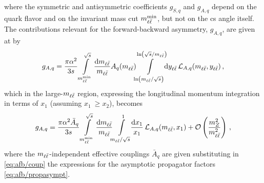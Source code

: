 where the symmetric and antisymmetric coefficients $g_{S,q}$ and $g_{A,q}$ depend on the quark flavor
and on the invariant mass cut $m_{\ell\bar{\ell}}^{\text{min}}$, but not on the
\acrlong{cs} angle itself.
%
The contributions relevant for the forward-backward asymmetry, $g_{A,q}$,
are given at \lo by
\begin{equation}
\label{eq:afb/gAq_integrated_1}
g_{A,q} =\frac{\pi \alpha^2}{3 s} \int\limits_{m_{\ell\bar{\ell}}^{\text{min}}}^{\sqrt s}\frac{\dd m_{\ell\bar{\ell}}}{m_{\ell\bar{\ell}}}A_{q}(m_{\ell\bar{\ell}})\!\!\int\limits_{\ln(m_{\ell\bar{\ell}}/\sqrt s)}^{\ln(\sqrt s/m_{\ell\bar{\ell}})}\!\!\dd y_{\ell\bar{\ell}}\, \mathcal{L}_{A,q}(m_{\ell\bar{\ell}},y_{\ell\bar{\ell}}) \, ,
\end{equation}
which in the large-$m_{\ell\bar{\ell}}$ region,
 expressing the longitudinal momentum integration in terms of
$x_1$ (assuming $x_1~\ge x_2$), becomes
\begin{equation}
  g_{A,q} = \frac{\pi \alpha^2\bar A_q}{3 s} \int\limits_{m_{\ell\bar{\ell}}^{\text{min}}}^{\sqrt s}\frac{\dd m_{\ell\bar{\ell}}}{m_{\ell\bar{\ell}}}
  \!\!\int\limits_{m_{\ell\bar{\ell}}/\sqrt s}^{1}\!\!\frac{\text{d}x_1}{x_1}\, 
  \mathcal{L}_{A,q}(m_{\ell\bar{\ell}},x_1)+\mathcal{O} \left(\frac{m_Z^2}{m_{\ell\bar{\ell}}^2}\right) \, ,
  \label{eq:afb/gAq_integrated}
\end{equation}
where the $m_{\ell\bar{\ell}}$-independent effective couplings $\bar A_q$  are
given substituting in \cref{eq:afb/coup} the expressions for
the asymptotic propagator factors \cref{eq:afb/propasympt}.

